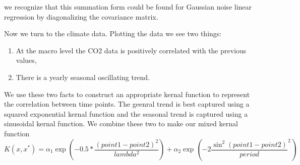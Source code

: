 \documentclass[a4paper]{article}
\begin{document}
we recognize that this summation form could be found for Gaussian noise linear regression by diagonalizing the covariance matrix. 

Now we turn to the climate data. Plotting the data we see two things: 
\begin{enumerate}
\item At the macro level the CO2 data is positively correlated with the previous values,
\item There is a yearly seasonal oscillating trend.
\end{enumerate}

We use these two facts to construct an appropriate kernal function to represent the correlation between time points. The geenral trend is best captured using a squared exponential kernal function and the seasonal trend is captured using a sinusoidal kernal function. We combine these two to make our mixed kernal function
\begin{equation}
K(x, x^*) = \alpha_1 \exp{\left(-0.5*\frac{{(point1 - point2)}^2}{lambda^2} \right)} + \alpha_2 \exp{\left(-2 \frac{\sin^2(point1 - point2)}{period}^2\right)}
\end{equation} 
\end{document}
